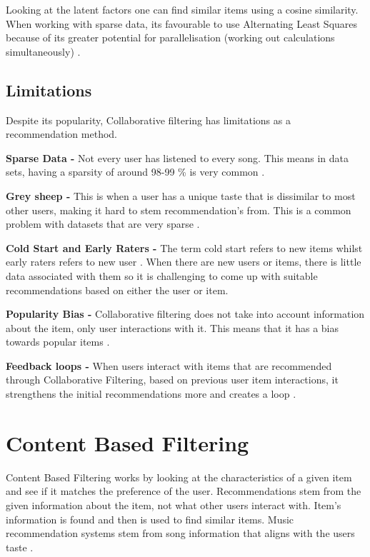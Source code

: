 Looking at the latent factors one can find  similar items using a cosine similarity. When working with sparse data, its favourable to use Alternating Least Squares because of its greater potential for parallelisation (working out calculations simultaneously) \citep{koren_matrix_2009}.

\subsection{Limitations}
Despite its popularity, Collaborative filtering has limitations as a recommendation method.

\textbf{Sparse Data - }Not every user has listened to every song. This means in data sets, having a sparsity of around 98-99 \% is very common \citep{celma_recommendation_2010}.

\textbf{Grey sheep - }This is when a user has a unique taste that is dissimilar to most other users, making it hard to stem recommendation's from. This is a common problem with datasets that are very sparse \citep{claypool_combining_1999}.

\textbf{Cold Start and Early Raters - } The term cold start refers to new items whilst early raters refers to new user \citep{avery_recommender_1997}. When there are new users or items, there is little data associated with them so it is challenging to come up with suitable recommendations based on either the user or item. 

\textbf{Popularity Bias - } Collaborative filtering does not take into account information about the item, only user interactions with it. This means that it has a bias towards popular items \citep{celma_recommendation_2010}.

\textbf{Feedback loops - } When users interact with items that are recommended through Collaborative Filtering, based on previous user item interactions, it strengthens the initial recommendations more and creates a loop \citep{sanchez-moreno_incorporating_2018}.

\section{Content Based Filtering}

Content Based Filtering works by looking at the characteristics of a given item and see if it matches the preference of the user. Recommendations stem from the given information about the item, not what other users interact with. Item's information is found and then is used to find similar items\citep{casey_content-based_2008}. Music recommendation systems stem from song information that aligns with the users taste \citep{aucouturier_music_2002, logan_music_2004}. 

